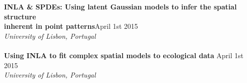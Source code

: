 \documentclass[10pt,letter]{article}
\begin{document}
                                                          \textbf{INLA \& SPDEs: 
                                                            Using latent Gaussian models to infer the spatial structure \\
                                                            inherent in point patterns}\hfill April 1st 2015\\
                                                                 {\sl University of Lisbon, Portugal}\\
                                                                 \hdashrule[0.5ex]{4cm}{1pt}{1pt}\\
                                                                 \textbf{Using INLA to fit complex spatial models to ecological data } \hfill April 1st 2015\\
                                                                        {\sl University of Lisbon, Portugal}\\
\newpage
\end{document}
